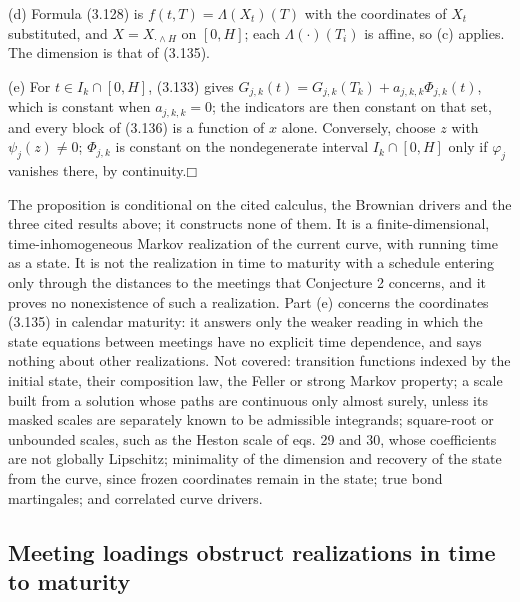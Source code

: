 \documentclass[11pt]{article}
\providecommand{\square}{\mdlgwhtsquare}
\begin{document}
(d) Formula (3.128) is \(f(t,T)=\Lambda(X_t)(T)\) with the coordinates of \(X_t\) substituted, and \(X=X_{\cdot\wedge H}\) on \([0,H]\); each \(\Lambda(\cdot)(T_i)\) is affine, so (c) applies. The dimension is that of (3.135).

(e) For \(t\in I_k\cap[0,H]\), (3.133) gives \(G_{j,k}(t)=G_{j,k}(T_k)+a_{j,k,k}\Phi_{j,k}(t)\), which is constant when \(a_{j,k,k}=0\); the indicators are then constant on that set, and every block of (3.136) is a function of \(x\) alone. Conversely, choose \(z\) with \(\psi_j(z)\neq0\); \(\Phi_{j,k}\) is constant on the nondegenerate interval \(I_k\cap[0,H]\) only if \(\varphi_j\) vanishes there, by continuity.\hfill$\square$

The proposition is conditional on the cited calculus, the Brownian drivers and the three cited results above; it constructs none of them. It is a finite-dimensional, time-inhomogeneous Markov realization of the current curve, with running time as a state. It is not the realization in time to maturity with a schedule entering only through the distances to the meetings that Conjecture 2 concerns, and it proves no nonexistence of such a realization. Part (e) concerns the coordinates (3.135) in calendar maturity: it answers only the weaker reading in which the state equations between meetings have no explicit time dependence, and says nothing about other realizations. Not covered: transition functions indexed by the initial state, their composition law, the Feller or strong Markov property; a scale built from a solution whose paths are continuous only almost surely, unless its masked scales are separately known to be admissible integrands; square-root or unbounded scales, such as the Heston scale of \cite{brace2024sofr} eqs. 29 and 30, whose coefficients are not globally Lipschitz; minimality of the dimension and recovery of the state from the curve, since frozen coordinates remain in the state; true bond martingales; and correlated curve drivers.

\subsection{Meeting loadings obstruct realizations in time to maturity}\label{sec:3.27}
\end{document}
